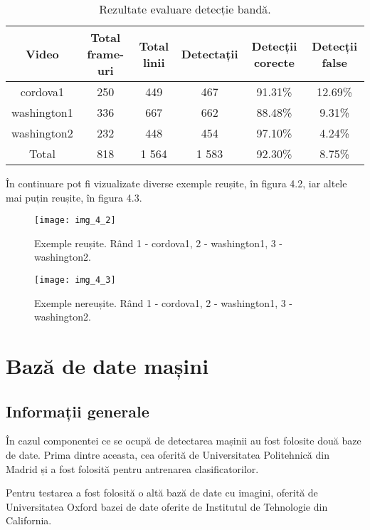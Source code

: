 \begin{table}[h!]
	\centering
	\begin{tabular}{||c | c | c | c | c | c ||} 
		\hline
		Video & Total frame-uri & Total linii & Detectații & Detecții corecte & Detecții false \\ [0.5ex] 
		\hline\hline
		cordova1 & 250 & 449 & 467 & 91.31\% & 12.69\%  \\ 
		washington1 & 336 & 667 & 662 & 88.48\% & 9.31\% \\
		washington2 & 232 & 448 & 454 & 97.10\% & 4.24\%  \\ 
		\hline\hline
		Total & 818 & 1 564 & 1 583 & 92.30\% & 8.75\% \\ [1ex]
		 
		\hline
	\end{tabular}
	\caption{Rezultate evaluare detecție bandă.}
	\label{table:1}
\end{table}

În continuare pot fi vizualizate diverse exemple reușite, în figura 4.2, iar altele mai puțin reușite, în figura 4.3.

\begin{figure}[!h]
	\centering
	\texttt{[image: img\_4\_2]}
	\caption[Detecție bandă - exemple reușite]{Exemple reușite. Rând 1 - cordova1, 2 - washington1, 3 - washington2.}
\end{figure}
\begin{figure}[!h]
	\centering
	\texttt{[image: img\_4\_3]}
	\caption[Detecție bandă - exemple nereușite]{Exemple nereușite. Rând 1 - cordova1, 2 - washington1, 3 - washington2.}
\end{figure}

\section{Bază de date mașini}

\subsection{Informații generale}

În cazul componentei ce se ocupă de detectarea mașinii au fost folosite două baze de date. Prima dintre aceasta, cea oferită de Universitatea Politehnică din Madrid și a fost folosită pentru antrenarea clasificatorilor. 

Pentru testarea a fost folosită o altă bază de date cu imagini, oferită de Universitatea Oxford bazei de date oferite de Institutul de Tehnologie din California.


